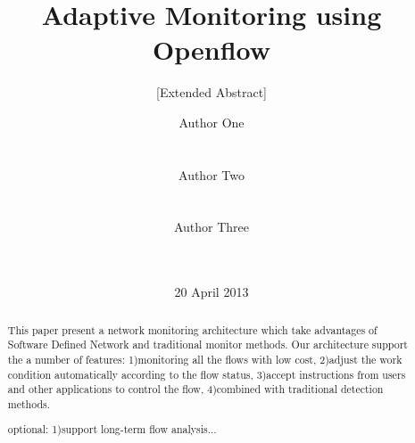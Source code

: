 \documentclass{acm_proc_article-sp}
\begin{document}
\title{Adaptive Monitoring using Openflow}
\subtitle{[Extended Abstract]}

\author{
\alignauthor
Author One\\
       \\
       \\
\alignauthor
Author Two\\
       \\
       \\
\alignauthor
Author Three\\
       \\
       \\
}


\date{20 April 2013}

\maketitle


\begin{abstract}
This paper present a network monitoring architecture which take advantages of Software Defined Network and traditional monitor methods. Our architecture support the a number of features: 1)monitoring all the flows with low cost, 2)adjust the work condition automatically according to the flow status, 3)accept instructions from users and other applications to control the flow, 4)combined with traditional detection methods.

optional: 1)support long-term flow analysis...
\end{abstract}


\end{document}
